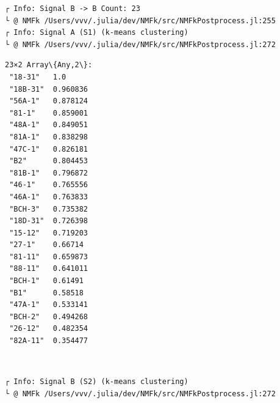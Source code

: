\documentclass[11pt]{article}
\begin{document}
    
    \begin{Verbatim}[commandchars=\\\{\}]
┌ Info: Signal B -> B Count: 23
└ @ NMFk /Users/vvv/.julia/dev/NMFk/src/NMFkPostprocess.jl:255
┌ Info: Signal A (S1) (k-means clustering)
└ @ NMFk /Users/vvv/.julia/dev/NMFk/src/NMFkPostprocess.jl:272
    \end{Verbatim}

    
    \begin{Verbatim}[commandchars=\\\{\}]
23×2 Array\{Any,2\}:
 "18-31"   1.0
 "18B-31"  0.960836
 "56A-1"   0.878124
 "81-1"    0.859001
 "48A-1"   0.849051
 "81A-1"   0.838298
 "47C-1"   0.826181
 "B2"      0.804453
 "81B-1"   0.796872
 "46-1"    0.765556
 "46A-1"   0.763833
 "BCH-3"   0.735382
 "18D-31"  0.726398
 "15-12"   0.719203
 "27-1"    0.66714
 "81-11"   0.659873
 "88-11"   0.641011
 "BCH-1"   0.61491
 "B1"      0.58518
 "47A-1"   0.533141
 "BCH-2"   0.494268
 "26-12"   0.482354
 "82A-11"  0.354477
    \end{Verbatim}

    
    \begin{center}
    \end{center}
    { \hspace*{\fill} \\}
    
    \begin{Verbatim}[commandchars=\\\{\}]
┌ Info: Signal B (S2) (k-means clustering)
└ @ NMFk /Users/vvv/.julia/dev/NMFk/src/NMFkPostprocess.jl:272
    \end{Verbatim}

    \begin{center}
    \end{center}
    { \hspace*{\fill} \\}
    
    \begin{Verbatim}[commandchars=\\\{\}]

    \end{Verbatim}

    \begin{center}
    \end{center}
    { \hspace*{\fill} \\}
    
\end{document}
